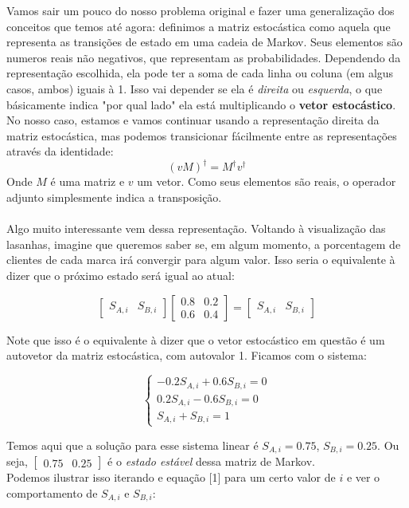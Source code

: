\documentclass[12pt]{article}
\begin{document}
Vamos sair um pouco do nosso problema original e fazer uma generalização dos conceitos que temos até agora: definimos a matriz estocástica como aquela que representa as transições de estado em uma cadeia de Markov. Seus elementos são numeros reais não negativos, que representam as probabilidades. Dependendo da representação escolhida, ela pode ter a soma de cada linha ou coluna (em algus casos, ambos) iguais à 1. Isso vai depender se ela é \textit{direita} ou \textit{esquerda}, o que básicamente indica "por qual lado" ela está multiplicando o \textbf{vetor estocástico}. No nosso caso, estamos e vamos continuar usando a representação direita da matriz estocástica, mas podemos transicionar fácilmente entre as representações através da identidade:
\begin{equation}
(vM)^{\dagger} = M^{\dagger} v^{\dagger}
\end{equation}
Onde $M$ é uma matriz e $v$ um vetor. Como seus elementos são reais, o operador adjunto simplesmente indica a transposição.\\
\\
Algo muito interessante vem dessa representação. Voltando à visualização das lasanhas, imagine que queremos saber se, em algum momento, a porcentagem de clientes de cada marca irá convergir para algum valor. Isso seria o equivalente à dizer que o próximo estado será igual ao atual:

$$
\begin{bmatrix}
S_{A, i} & S_{B, i}
\end{bmatrix}
\begin{bmatrix}
0.8 & 0.2\\
0.6 & 0.4
\end{bmatrix}
=
\begin{bmatrix}
S_{A, i} & S_{B, i}
\end{bmatrix}
$$

Note que isso é o equivalente à dizer que o vetor estocástico em questão é um autovetor da matriz estocástica, com autovalor 1. Ficamos com o sistema:

$$
\left\{
\begin{array}{ll}
-0.2 S_{A, i} + 0.6 S_{B, i} = 0\\
0.2 S_{A, i}  - 0.6 S_{B, i} = 0\\
S_{A, i} + S_{B, i} = 1
\end{array}\right.
$$

Temos aqui que a solução para esse sistema linear é $S_{A, i} = 0.75$, $S_{B, i} = 0.25$. Ou seja, $\begin{bmatrix} 0.75 & 0.25 \end{bmatrix}$ é o \textit{estado estável} dessa matriz de Markov.\\ 
Podemos ilustrar isso iterando e equação [1] para um certo valor de $i$ e ver o comportamento de $S_{A, i}$ e $S_{B, i}$:
\end{document}
